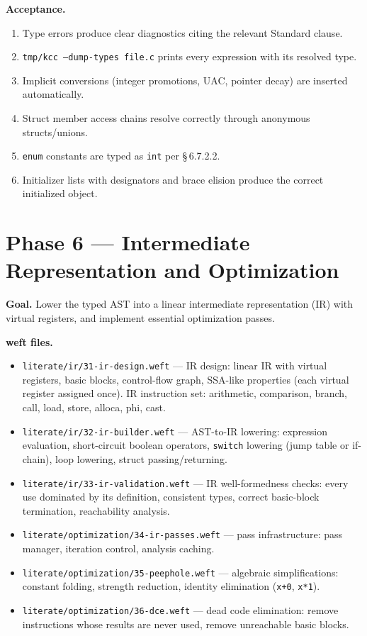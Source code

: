 \documentclass[11pt,a4paper,twoside,openright,DIV=15]{scrbook}
\theoremstyle{definition}
\theoremstyle{plain}
\theoremstyle{remark}
\newcommand{\stdref}[1]{\S\,#1}
\begin{document}
\textbf{Acceptance.}
\begin{enumerate}
\item Type errors produce clear diagnostics citing the
      relevant Standard clause.
\item \texttt{tmp/kcc --dump-types file.c} prints every
      expression with its resolved type.
\item Implicit conversions (integer promotions, UAC, pointer
      decay) are inserted automatically.
\item Struct member access chains resolve correctly through
      anonymous structs/unions.
\item \texttt{enum} constants are typed as \texttt{int} per
      \stdref{6.7.2.2}.
\item Initializer lists with designators and brace elision
      produce the correct initialized object.
\end{enumerate}

\section{Phase 6 --- Intermediate Representation and Optimization}
\label{sec:phase6}

\textbf{Goal.}  Lower the typed AST into a linear intermediate
representation (IR) with virtual registers, and implement
essential optimization passes.

\textbf{weft files.}
\begin{itemize}
\item \texttt{literate/ir/31-ir-design.weft} ---
      IR design: linear IR with virtual registers, basic blocks,
      control-flow graph, SSA-like properties (each virtual
      register assigned once).  IR instruction set: arithmetic,
      comparison, branch, call, load, store, alloca, phi, cast.
\item \texttt{literate/ir/32-ir-builder.weft} ---
      AST-to-IR lowering: expression evaluation, short-circuit
      boolean operators, \texttt{switch} lowering (jump table or
      if-chain), loop lowering, struct passing/returning.
\item \texttt{literate/ir/33-ir-validation.weft} ---
      IR well-formedness checks: every use dominated by its
      definition, consistent types, correct basic-block
      termination, reachability analysis.
\item \texttt{literate/optimization/34-ir-passes.weft} ---
      pass infrastructure: pass manager, iteration control,
      analysis caching.
\item \texttt{literate/optimization/35-peephole.weft} ---
      algebraic simplifications: constant folding, strength
      reduction, identity elimination (\texttt{x+0}, \texttt{x*1}).
\item \texttt{literate/optimization/36-dce.weft} ---
      dead code elimination: remove instructions whose results
      are never used, remove unreachable basic blocks.
\end{itemize}
\end{document}
